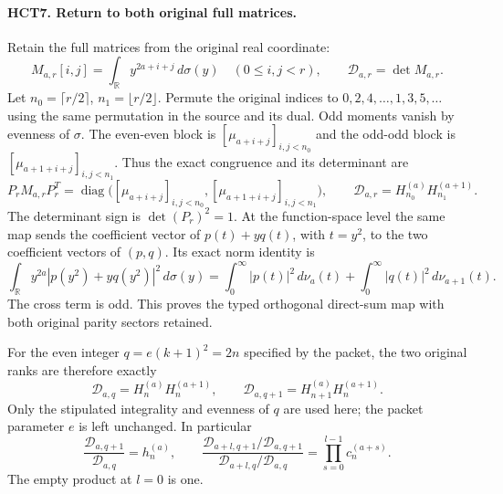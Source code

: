 \paragraph{HCT7. Return to both original full matrices.}
Retain the full matrices from the original real coordinate:
\begin{equation}\tag{HCT31}
 M_{a,r}[i,j]=\int_{\mathbb R}y^{2a+i+j}\,d\sigma(y)
 \quad(0\leq i,j<r),\qquad \mathcal D_{a,r}=\det M_{a,r}.
\end{equation}
Let $n_0=\lceil r/2\rceil$, $n_1=\lfloor r/2\rfloor$.
Permute the original indices to $0,2,4,\ldots,1,3,5,\ldots$
using the same permutation in the source and its dual. Odd
moments vanish by evenness of $\sigma$. The even-even block is
$[\mu_{a+i+j}]_{i,j<n_0}$ and the odd-odd block is
$[\mu_{a+1+i+j}]_{i,j<n_1}$. Thus the exact congruence and
its determinant are
\begin{equation}\tag{HCT32}
 P_r M_{a,r}P_r^T=
 \operatorname{diag}\big([\mu_{a+i+j}]_{i,j<n_0},
 [\mu_{a+1+i+j}]_{i,j<n_1}\big),\qquad
 \mathcal D_{a,r}=H_{n_0}^{(a)}H_{n_1}^{(a+1)}.
\end{equation}
The determinant sign is $\det(P_r)^2=1$.
At the function-space level the same map sends the coefficient
vector of $p(t)+yq(t)$, with $t=y^2$, to the two coefficient
vectors of $(p,q)$. Its exact norm identity is
\[
 \int_{\mathbb R}y^{2a}|p(y^2)+yq(y^2)|^2\,d\sigma(y)
 =\int_0^\infty|p(t)|^2\,d\nu_a(t)
  +\int_0^\infty|q(t)|^2\,d\nu_{a+1}(t).
\]
The cross term is odd. This proves the typed orthogonal direct-sum
map with both original parity sectors retained.

For the even integer $q=e(k+1)^2=2n$ specified by the packet,
the two original ranks are therefore exactly
\begin{equation}\tag{HCT33}
 \mathcal D_{a,q}=H_n^{(a)}H_n^{(a+1)},\qquad
 \mathcal D_{a,q+1}=H_{n+1}^{(a)}H_n^{(a+1)}.
\end{equation}
Only the stipulated integrality and evenness of $q$ are used here;
the packet parameter $e$ is left unchanged.
In particular
\begin{equation}\tag{HCT34}
 \frac{\mathcal D_{a,q+1}}{\mathcal D_{a,q}}=h_n^{(a)},\qquad
 \frac{\mathcal D_{a+l,q+1}/\mathcal D_{a,q+1}}
 {\mathcal D_{a+l,q}/\mathcal D_{a,q}}
 =\prod_{s=0}^{l-1}c_n^{(a+s)}.
\end{equation}
The empty product at $l=0$ is one.

